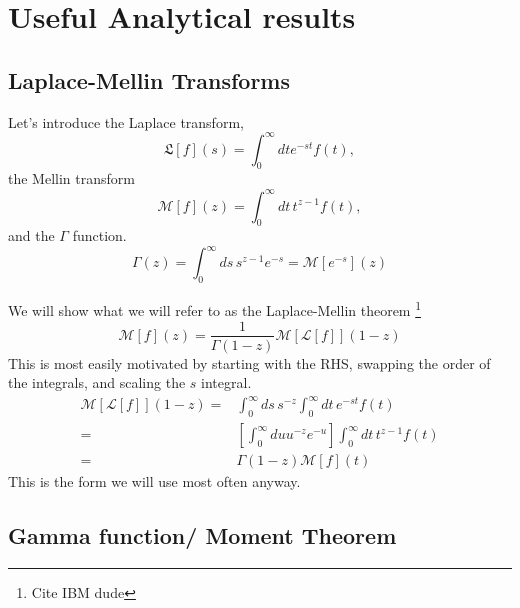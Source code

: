 \section{Useful Analytical results}

\subsection{ Laplace-Mellin Transforms}

Let's introduce the Laplace transform, 
\begin{equation}
\mathfrak{L}[f](s) = \int_0^\infty dt e^{-st} f(t),
\end{equation}
the Mellin transform
\begin{equation}
\mathcal{M}[f](z)= \int_0^\infty dt\, t^{z-1}f(t),
\end{equation}
and the $\Gamma$ function.  
\begin{equation}
\Gamma(z) = \int_0^\infty ds\, s^{z-1} e^{-s} = \mathcal{M}[e^{-s}](z)
\end{equation}

We will show what we will refer to as the Laplace-Mellin theorem \footnote{Cite IBM dude}
\begin{equation}
\mathcal{M}[f](z) = \frac{1}{\Gamma(1-z)}\mathcal{M}[\mathcal{L}[f]](1-z)\label{eq:Laplace-Mellin}
\end{equation}
This is most easily motivated by starting with the RHS, swapping the order of the integrals, and scaling the $s$ integral.  
\begin{align}
\mathcal{M}[\mathcal{L}[f]](1-z) =& 
\int_0^\infty ds\, s^{-z} \int_0^\infty dt\,e^{-st} f(t)\\ 
=&\left[\int_0^\infty du u^{-z} e^{-u}\right]\int_0^\infty dt\,t^{z-1} f(t) \\
=& \Gamma(1-z)\mathcal{M}[f](t)
\end{align}
This is the form we will use most often anyway.  
\subsection{Gamma function/ Moment Theorem}


